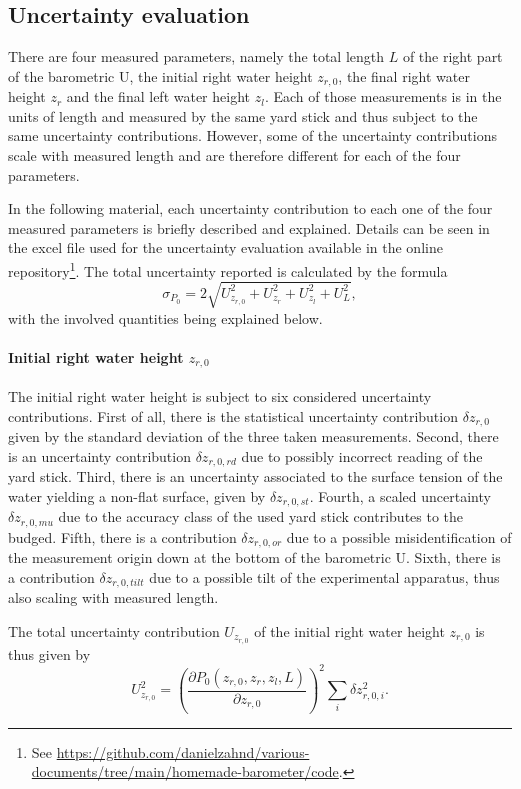 \documentclass[a4paper,10pt, twocolumn]{article}
\begin{document}
\subsection{Uncertainty evaluation}
There are four measured parameters, namely the total length $L$ of the right part of the barometric U, the initial right water height $z_{r,0}$, the final right water height $z_r$ and the final left water height $z_l$. Each of those measurements is in the units of length and measured by the same yard stick and thus subject to the same uncertainty contributions. However, some of the uncertainty contributions scale with measured length and are therefore different for each of the four parameters.

In the following material, each uncertainty contribution to each one of the four measured parameters is briefly described and explained. Details can be seen in the excel file used for the uncertainty evaluation available in the online repository\footnote{See \url{https://github.com/danielzahnd/various-documents/tree/main/homemade-barometer/code}.}. The total uncertainty reported is calculated by the formula \begin{equation}
	\sigma_{P_0} = 2\sqrt{U_{z_{r,0}}^2 + U_{z_r}^2 + U_{z_l}^2 + U_L^2},
\end{equation} with the involved quantities being explained below.

\paragraph{Initial right water height $z_{r,0}$} The initial right water height is subject to six considered uncertainty contributions. First of all, there is the statistical uncertainty contribution $\delta {z_{r,0}}$ given by the standard deviation of the three taken measurements. Second, there is an uncertainty contribution $\delta z_{r,0,rd}$ due to possibly incorrect reading of the yard stick. Third, there is an uncertainty associated to the surface tension of the water yielding a non-flat surface, given by $\delta z_{r,0,st}$. Fourth, a scaled uncertainty $\delta z_{r,0,mu}$ due to the accuracy class of the used yard stick contributes to the budged. Fifth, there is a contribution $\delta z_{r,0,or}$ due to a possible misidentification of the measurement origin down at the bottom of the barometric U. Sixth, there is a contribution $\delta z_{r,0,tilt}$ due to a possible tilt of the experimental apparatus, thus also scaling with measured length. 

The total uncertainty contribution $U_{z_{r,0}}$ of the initial right water height $z_{r,0}$ is thus given by \begin{equation}
	U_{z_{r,0}}^2 = \left(\frac{\partial P_0(z_{r,0}, z_r, z_l, L)}{\partial z_{r,0}}\right)^2\sum_{i}\delta z_{r,0,i}^2.
\end{equation}
\end{document}
